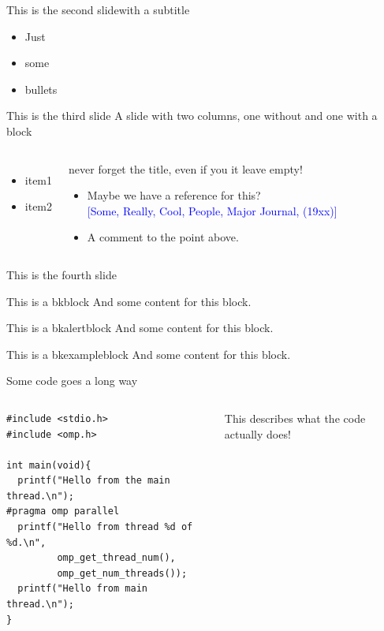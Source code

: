 \begin{frame}{This is the second slide}{with a subtitle}
  \begin{itemize}
    \item Just
    \item some
    \item bullets
  \end{itemize}
\end{frame}

\begin{frame}{This is the third slide}
A slide with two columns, one without and one with a block
\begin{columns}
    \begin{itemize}
      \item item1
      \item item2
    \end{itemize}
  \begin{block}{never forget the title, {\tiny even if you it leave empty!} }
    \begin{itemize}
      \item{Maybe we have a reference for this? \\ \hfill \textcolor{blue}{\footnotesize [Some, Really, Cool, People, Major Journal, (19xx)]}}
      \vspace{0.2cm}
      \item{A comment to the point above.}
    \end{itemize}
  \end{block}

\end{columns}
\end{frame}

\begin{frame}{This is the fourth slide}
  \begin{bkblock}{This is a bkblock}
    And some content for this block.
  \end{bkblock}
  \begin{bkalertblock}{This is a bkalertblock}
    And some content for this block.
  \end{bkalertblock}
  \begin{bkexampleblock}{This is a bkexampleblock}
    And some content for this block.
  \end{bkexampleblock}
\end{frame}

\begin{frame}[fragile]{Some code goes a long way}
  \begin{columns}
      \begin{verbatim}
#include <stdio.h>
#include <omp.h>

int main(void){
  printf("Hello from the main thread.\n");
#pragma omp parallel
  printf("Hello from thread %d of %d.\n",
         omp_get_thread_num(), 
         omp_get_num_threads());
  printf("Hello from main thread.\n");
}
      \end{verbatim}
      This describes what the code actually does!
  \end{columns}
\end{frame}


